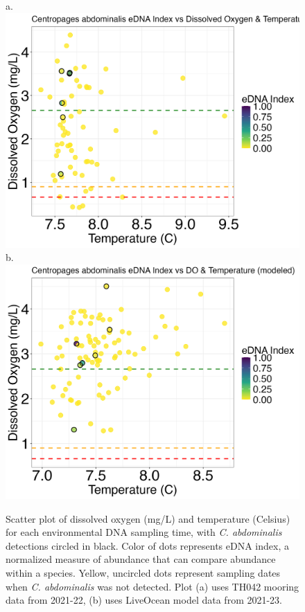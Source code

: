 \documentclass[12pt,twoside]{reedthesis}
\begin{document}
	\begin{figure}[!h]
		\begin{center}
			a. \includegraphics[scale=0.3]{Cabdominalis_Scatter_noOut}
			b. \includegraphics[scale=0.3]{Cabdominalis_Scatter_AllYr_mod_noOut}
			\caption[\textit{C. abdominalis} scatterplot]{\footnotesize{Scatter plot of dissolved oxygen (mg/L) and temperature (Celsius) for each environmental DNA sampling time, with \textit{C. abdominalis} detections circled in black. Color of dots represents eDNA index, a normalized measure of abundance that can compare abundance within a species. Yellow, uncircled dots represent sampling dates when \textit{C. abdominalis} was not detected. Plot (a) uses TH042 mooring data from 2021-22, (b) uses LiveOcean model data from 2021-23.}} %
			\label{CabdominalisScatter}
		\end{center}
	\end{figure} 
	
\end{document}
